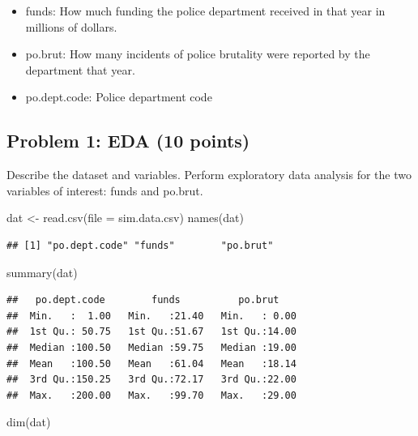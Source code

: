 \documentclass[
]{article}
\newenvironment{Shaded}{\begin{snugshade}}{\end{snugshade}}
\newcommand{\AttributeTok}[1]{\textcolor[rgb]{0.77,0.63,0.00}{#1}}
\newcommand{\FunctionTok}[1]{\textcolor[rgb]{0.00,0.00,0.00}{#1}}
\newcommand{\NormalTok}[1]{#1}
\newcommand{\OtherTok}[1]{\textcolor[rgb]{0.56,0.35,0.01}{#1}}
\newcommand{\StringTok}[1]{\textcolor[rgb]{0.31,0.60,0.02}{#1}}
\providecommand{\tightlist}{%
  \setlength{\itemsep}{0pt}\setlength{\parskip}{0pt}}
\begin{document}
\begin{itemize}
\tightlist
\item
  funds: How much funding the police department received in that year in
  millions of dollars.
\item
  po.brut: How many incidents of police brutality were reported by the
  department that year.
\item
  po.dept.code: Police department code
\end{itemize}

\hypertarget{problem-1-eda-10-points}{%
\subsection{Problem 1: EDA (10 points)}\label{problem-1-eda-10-points}}

Describe the dataset and variables. Perform exploratory data analysis
for the two variables of interest: funds and po.brut.

\begin{Shaded}
\begin{Highlighting}[]
\NormalTok{dat }\OtherTok{\textless{}{-}} \FunctionTok{read.csv}\NormalTok{(}\AttributeTok{file =} \StringTok{\textquotesingle{}sim.data.csv\textquotesingle{}}\NormalTok{)}
\FunctionTok{names}\NormalTok{(dat)}
\end{Highlighting}
\end{Shaded}

\begin{verbatim}
## [1] "po.dept.code" "funds"        "po.brut"
\end{verbatim}

\begin{Shaded}
\begin{Highlighting}[]
\FunctionTok{summary}\NormalTok{(dat)}
\end{Highlighting}
\end{Shaded}

\begin{verbatim}
##   po.dept.code        funds          po.brut     
##  Min.   :  1.00   Min.   :21.40   Min.   : 0.00  
##  1st Qu.: 50.75   1st Qu.:51.67   1st Qu.:14.00  
##  Median :100.50   Median :59.75   Median :19.00  
##  Mean   :100.50   Mean   :61.04   Mean   :18.14  
##  3rd Qu.:150.25   3rd Qu.:72.17   3rd Qu.:22.00  
##  Max.   :200.00   Max.   :99.70   Max.   :29.00
\end{verbatim}

\begin{Shaded}
\begin{Highlighting}[]
\FunctionTok{dim}\NormalTok{(dat)}
\end{Highlighting}
\end{Shaded}
\end{document}
